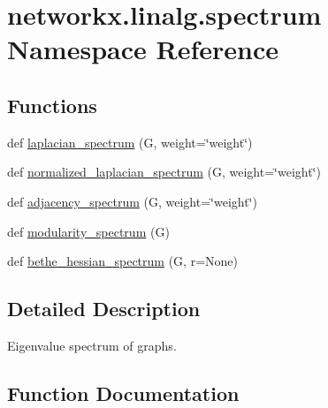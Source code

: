 \hypertarget{namespacenetworkx_1_1linalg_1_1spectrum}{}\section{networkx.\+linalg.\+spectrum Namespace Reference}
\label{namespacenetworkx_1_1linalg_1_1spectrum}
\subsection*{Functions}
\begin{DoxyCompactItemize}
\item 
def \hyperlink{namespacenetworkx_1_1linalg_1_1spectrum_a3dcfffa7b1aecf8e735e0b79c38602e2}{laplacian\+\_\+spectrum} (G, weight=\char`\"{}weight\char`\"{})
\item 
def \hyperlink{namespacenetworkx_1_1linalg_1_1spectrum_a8c63fefa8333b1c2e76ad1f5db2ca60d}{normalized\+\_\+laplacian\+\_\+spectrum} (G, weight=\char`\"{}weight\char`\"{})
\item 
def \hyperlink{namespacenetworkx_1_1linalg_1_1spectrum_a879ae10f732a232e755b2f9d8ec67c1b}{adjacency\+\_\+spectrum} (G, weight=\char`\"{}weight\char`\"{})
\item 
def \hyperlink{namespacenetworkx_1_1linalg_1_1spectrum_ac85c3062adc5046b637c5f93ab7ab735}{modularity\+\_\+spectrum} (G)
\item 
def \hyperlink{namespacenetworkx_1_1linalg_1_1spectrum_aa1ab745086a1f90e352b4000d41764f7}{bethe\+\_\+hessian\+\_\+spectrum} (G, r=None)
\end{DoxyCompactItemize}


\subsection{Detailed Description}
\begin{DoxyVerb}Eigenvalue spectrum of graphs.
\end{DoxyVerb}
 

\subsection{Function Documentation}
\mbox{\label{namespacenetworkx_1_1linalg_1_1spectrum_a879ae10f732a232e755b2f9d8ec67c1b}} 
